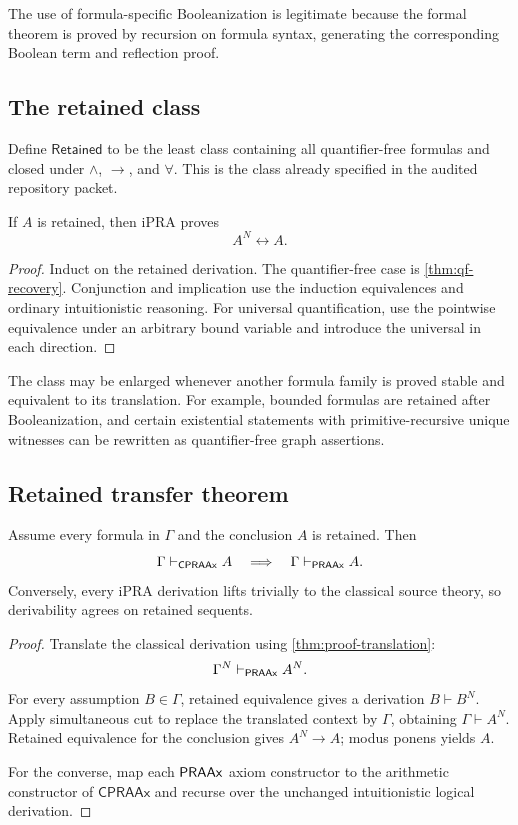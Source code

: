 The use of formula-specific Booleanization is legitimate because the formal theorem is proved by recursion on formula syntax, generating the corresponding Boolean term and reflection proof.

\subsection{The retained class}

Define \(\mathsf{Retained}\) to be the least class containing all quantifier-free formulas and closed under \(\wedge\), \(\to\), and \(\forall\).  This is the class already specified in the audited repository packet.

\begin{theorem}
\label{thm:retained-equivalence}
If \(A\) is retained, then iPRA proves
\[
  A^N\leftrightarrow A.
\]
\end{theorem}

\begin{proof}
Induct on the retained derivation.  The quantifier-free case is \cref{thm:qf-recovery}.  Conjunction and implication use the induction equivalences and ordinary intuitionistic reasoning.  For universal quantification, use the pointwise equivalence under an arbitrary bound variable and introduce the universal in each direction.
\end{proof}

The class may be enlarged whenever another formula family is proved stable and equivalent to its translation.  For example, bounded formulas are retained after Booleanization, and certain existential statements with primitive-recursive unique witnesses can be rewritten as quantifier-free graph assertions.

\subsection{Retained transfer theorem}

\begin{theorem}
\label{thm:retained-transfer}
Assume every formula in \(\Gamma\) and the conclusion \(A\) is retained.  Then
\[
 \Gamma\vdash_{\mathsf{CPRAAx}}A
 \quad\Longrightarrow\quad
 \Gamma\vdash_{\mathsf{PRAAx}}A.
\]
Conversely, every iPRA derivation lifts trivially to the classical source theory, so derivability agrees on retained sequents.
\end{theorem}

\begin{proof}
Translate the classical derivation using \cref{thm:proof-translation}:
\[
 \Gamma^N\vdash_{\mathsf{PRAAx}}A^N.
\]
For every assumption \(B\in\Gamma\), retained equivalence gives a derivation \(B\vdash B^N\).  Apply simultaneous cut to replace the translated context by \(\Gamma\), obtaining \(\Gamma\vdash A^N\).  Retained equivalence for the conclusion gives \(A^N\to A\); modus ponens yields \(A\).

For the converse, map each \(\mathsf{PRAAx}\) axiom constructor to the arithmetic constructor of \(\mathsf{CPRAAx}\) and recurse over the unchanged intuitionistic logical derivation.
\end{proof}


